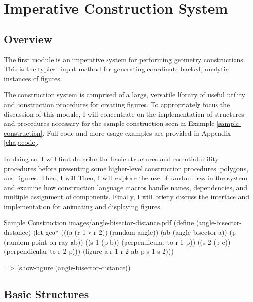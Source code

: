 \chapter{Imperative Construction System}
\label{chap:imperative}

\section{Overview}

The first module is an imperative system for performing geometry
constructions. This is the typical input method for generating
coordinate-backed, analytic instances of figures.

The construction system is comprised of a large, versatile library of
useful utility and construction procedures for creating figures. To
appropriately focus the discussion of this module, I will concentrate
on the implementation of structures and procedures necessary for the
sample construction seen in Example \ref{sample-construction}.  Full
code and more usage examples are provided in Appendix \ref{chap:code}.

In doing so, I will first describe the basic structures and essential
utility procedures before presenting some higher-level construction
procedures, polygons, and figures. Then, I will Then, I will explore
the use of randomness in the system and examine how construction
language macros handle names, dependencies, and multiple assignment of
components.  Finally, I will briefly discuss the interface and
implementation for animating and displaying figures.

\begin{pdf-example}
[label=sample-construction]
{Sample Construction}
{images/angle-bisector-distance.pdf}
(define (angle-bisector-distance)
  (let-geo* (((a (r-1 v r-2)) (random-angle))
             (ab (angle-bisector a))
             (p (random-point-on-ray ab))
             ((s-1 (p b)) (perpendicular-to r-1 p))
             ((s-2 (p c)) (perpendicular-to r-2 p)))
     (figure a r-1 r-2 ab p s-1 s-2)))

=> (show-figure (angle-bisector-distance))
\end{pdf-example}


\section{Basic Structures}

